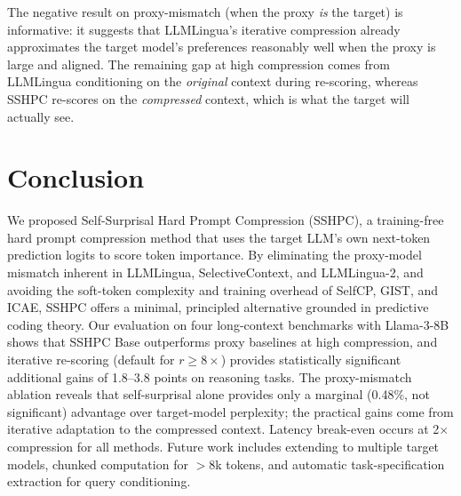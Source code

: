 \documentclass[11pt,letterpaper]{article}
\begin{document}
The negative result on proxy-mismatch (when the proxy \textit{is} the target) is informative: it suggests that LLMLingua's iterative compression already approximates the target model's preferences reasonably well when the proxy is large and aligned. The remaining gap at high compression comes from LLMLingua conditioning on the \textit{original} context during re-scoring, whereas SSHPC re-scores on the \textit{compressed} context, which is what the target will actually see.

\section{Conclusion}

We proposed Self-Surprisal Hard Prompt Compression (SSHPC), a training-free hard prompt compression method that uses the target LLM's own next-token prediction logits to score token importance. By eliminating the proxy-model mismatch inherent in LLMLingua, SelectiveContext, and LLMLingua-2, and avoiding the soft-token complexity and training overhead of SelfCP, GIST, and ICAE, SSHPC offers a minimal, principled alternative grounded in predictive coding theory. Our evaluation on four long-context benchmarks with Llama-3-8B shows that SSHPC Base outperforms proxy baselines at high compression, and iterative re-scoring (default for $r \ge 8\times$) provides statistically significant additional gains of 1.8--3.8 points on reasoning tasks. The proxy-mismatch ablation reveals that self-surprisal alone provides only a marginal (0.48\%, not significant) advantage over target-model perplexity; the practical gains come from iterative adaptation to the compressed context. Latency break-even occurs at 2$\times$ compression for all methods. Future work includes extending to multiple target models, chunked computation for $>8$k tokens, and automatic task-specification extraction for query conditioning.



\end{document}
